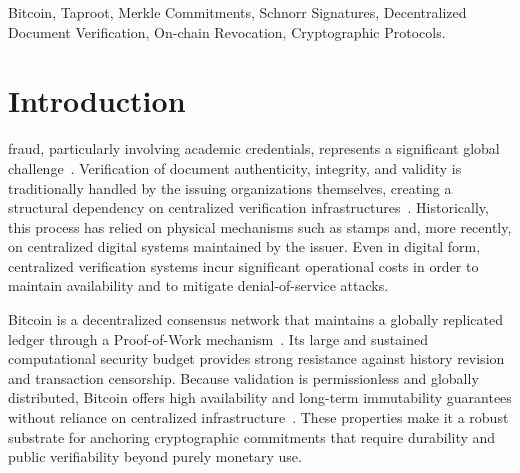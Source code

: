 \documentclass{IEEEoj}
\begin{document}
\begin{IEEEkeywords}
Bitcoin, Taproot, Merkle Commitments, Schnorr Signatures, Decentralized Document Verification, On-chain Revocation, Cryptographic Protocols.
\end{IEEEkeywords}

\maketitle

\section{Introduction}
\label{sec.intro}

 fraud, particularly involving academic credentials, represents a significant global challenge~\cite{Xie2020EthereumCertificate}. Verification of document authenticity, integrity, and validity is traditionally handled by the issuing organizations themselves, creating a structural dependency on centralized verification infrastructures~\cite{shende2024enhancing}. 
Historically, this process has relied on physical mechanisms such as stamps and, more recently, on centralized digital systems maintained by the issuer. 
Even in digital form, centralized verification systems incur significant operational costs in order to maintain availability and to mitigate denial-of-service attacks.

Bitcoin is a decentralized consensus network that maintains a globally replicated ledger through a Proof-of-Work mechanism~\cite{nakamoto2008bitcoin}. 
Its large and sustained computational security budget provides strong resistance against history revision and transaction censorship. 
Because validation is permissionless and globally distributed, Bitcoin offers high availability and long-term immutability guarantees without reliance on centralized infrastructure~\cite{Lemieux2016Trusting}. 
These properties make it a robust substrate for anchoring cryptographic commitments that require durability and public verifiability beyond purely monetary use.
\end{document}
